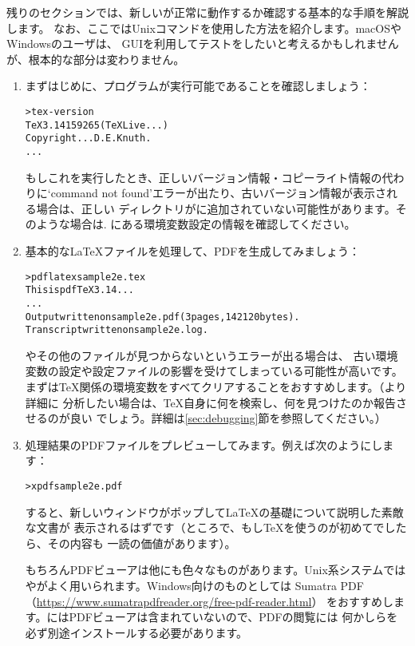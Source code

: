 \documentclass[uplatex,dvipdfmx,12pt,tombow]{jsarticle}
\begin{document}
残りのセクションでは、新しい\TL が正常に動作するか確認する基本的な手順を解説します。
なお、ここではUnixコマンドを使用した方法を紹介します。macOSやWindowsのユーザは、
GUIを利用してテストをしたいと考えるかもしれませんが、根本的な部分は変わりません。

\begin{enumerate}
\item まずはじめに、プログラムが実行可能であることを確認しましょう：
%
\begin{alltt}
> tex -version
TeX 3.14159265 (TeX Live ...)
Copyright ... D.E. Knuth.
...
\end{alltt}
%
もしこれを実行したとき、正しいバージョン情報・コピーライト情報の代わりに`command
not found'エラーが出たり、古いバージョン情報が表示される場合は、正しい%
ディレクトリがに追加されていない可能性があります。そのような場合は\p.%
\pageref{sec:env}にある環境変数設定の情報を確認してください。

\item 基本的な\LaTeX ファイルを処理して、PDFを生成してみましょう：
%
\begin{alltt}
> pdflatex sample2e.tex
This is pdfTeX 3.14...
...
Output written on sample2e.pdf (3 pages, 142120 bytes).
Transcript written on sample2e.log.
\end{alltt}
%
やその他のファイルが見つからないというエラーが出る場合は、
古い環境変数の設定や設定ファイルの影響を受けてしまっている可能性が高いです。
まずは\TeX 関係の環境変数をすべてクリアすることをおすすめします。（より詳細に
分析したい場合は、\TeX 自身に何を検索し、何を見つけたのか報告させるのが良い
でしょう。詳細は\ref{sec:debugging}節を参照してください。）

\item 処理結果のPDFファイルをプレビューしてみます。例えば次のようにします：
%
\begin{alltt}
> xpdf sample2e.pdf
\end{alltt}
%
すると、新しいウィンドウがポップして\LaTeX の基礎について説明した素敵な文書が
表示されるはずです（ところで、もし\TeX を使うのが初めてでしたら、その内容も
一読の価値があります）。

もちろんPDFビューアは他にも色々なものがあります。Unix系システムでは
やがよく用いられます。Windows向けのものとしては
Sumatra PDF（\url{https://www.sumatrapdfreader.org/free-pdf-reader.html}）
をおすすめします。\TL にはPDFビューアは含まれていないので、PDFの閲覧には
何かしらを必ず別途インストールする必要があります。


\end{enumerate}
\end{document}
